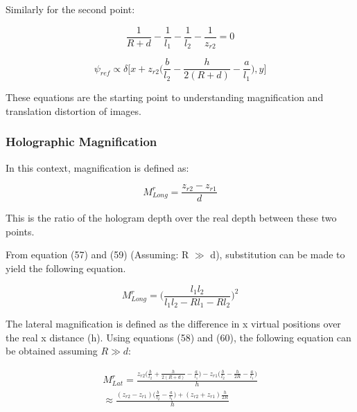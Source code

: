 \documentclass[12pt]{article}
\begin{document}
Similarly for the second point:

\begin{equation}
	\frac{1}{R + d} - \frac{1}{l_{1}} - \frac{1}{l_{2}} - \frac{1}{z_{r2}} = 0
\end{equation}

\begin{equation}
        \psi_{ref} \propto \delta \bigg[ x + z_{r2}\bigg(
        \frac{b}{l_{2}} - \frac{h}{2(R + d)} - \frac{a}{l_{1}}\bigg),y\bigg]
\end{equation}

These equations are the starting point to understanding magnification and translation distortion of images.

\subsubsection{Holographic Magnification}

In this context, magnification is defined as:

\begin{equation}
	M_{Long}^r = \frac{z_{r2} - z_{r1}}{d}
\end{equation}

This is the ratio of the hologram depth over the real depth between these two points.

From equation (57) and (59) (Assuming: R \(\gg\) d), substitution can be made to yield the following equation.

\begin{equation}
	M_{Long}^r = \bigg(\frac{l_{1}l_{2}}{l_{1}l_{2} - Rl_{1} - Rl_{2}}\bigg)^2
\end{equation}

The lateral magnification is defined as the difference in x virtual positions over the real x distance (h). Using equations (58) and (60), the following equation can be obtained assuming \(R \gg d\):

\begin{equation}
	\begin{multlined}
		M_{Lat}^r = \frac{z_{r2}\bigg( \frac{b}{l_{2}} + \frac{h}{2(R + d)} - \frac{a}{l_{1}}\bigg) - z_{r1}\bigg(\frac{b}{l_{2}} - \frac{h}{2R} - \frac{a}{l_{1}} \bigg)}{h}
		\\\approx \frac{(z_{r2} - z_{r1})\bigg(\frac{b}{l_{2}} -\frac{a}{l_{1}} \bigg) + (z_{r2} + z_{r1})\frac{h}{2R}}{h}
	\end{multlined}
\end{equation}
\end{document}
